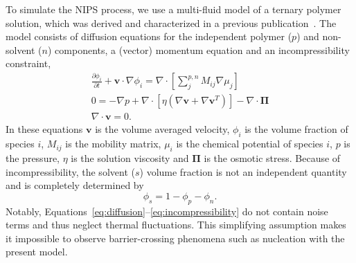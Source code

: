 \documentclass[journal=mamobx, layout=twocolumn]{achemso}
\begin{document}
To simulate the NIPS process, we use a multi-fluid model of a ternary polymer solution, which was derived and characterized in a previous publication~\cite{Tree2017}.
The model consists of diffusion equations for the independent polymer ($p$) and non-solvent ($n$) components, a (vector) momentum equation and an incompressibility constraint,
\begin{gather}
  \frac{\partial \phi_{i}}{\partial t} + \bm{v} \cdot \nabla \phi_{i} =
    \nabla \cdot \left [ \sum_{j}^{p,n} M_{ij} \nabla \mu_{j} \right ] \label{eq:diffusion} \\
  0 = -\nabla p + \nabla \cdot \left [ \eta (\nabla \bm{v} + \nabla \bm{v}^{T}) \right ] 
    - \nabla \cdot \bm{\Pi} \label{eq:momentum} \\
  \nabla \cdot \bm{v} = 0 \label{eq:incompressibility} \textrm{.}
\end{gather}
In these equations $\bm{v}$ is the volume averaged velocity, $\phi_{i}$ is the volume fraction of species $i$, $M_{ij}$ is the mobility matrix, $\mu_{i}$ is the chemical potential of species $i$, $p$ is the pressure, $\eta$ is the solution viscosity and $\bm{\Pi}$ is the osmotic stress.
Because of incompressibility, the solvent ($s$) volume fraction is not an independent quantity and is completely determined by
\begin{equation}
\phi_{s} = 1 - \phi_{p} - \phi_{n} \textrm{.}
\end{equation}
Notably, Equations~\ref{eq:diffusion}--\ref{eq:incompressibility} do not contain noise terms and thus neglect thermal fluctuations.
This simplifying assumption makes it impossible to observe barrier-crossing phenomena such as nucleation with the present model.
\end{document}

